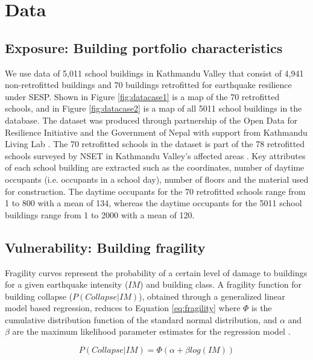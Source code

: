 \documentclass[utf8]{frontiersSCNS} %
\begin{document}
\section{Data}
\label{section-data}

\subsection{Exposure: Building portfolio characteristics}

    We use data of 5,011 school buildings in Kathmandu Valley that consist of 4,941 non-retrofitted buildings and 70 buildings retrofitted for earthquake resilience under SESP. Shown in Figure \ref{fig:datacase1} is a map of the 70 retrofitted schools, and in Figure \ref{fig:datacase2} is a map of all 5011 school buildings in the database. The dataset was produced through partnership of the Open Data for Resilience Initiative and the Government of Nepal with support from Kathmandu Living Lab \citep{opendri_2012}. The 70 retrofitted schools in the dataset is part of the 78 retrofitted schools surveyed by NSET in Kathmandu Valley's affected areas \citep{marasini_2019}. Key attributes of each school building are extracted such as the coordinates, number of daytime occupants (i.e. occupants in a school day), number of floors and the material used for construction. The daytime occupants for the 70 retrofitted schools range from 1 to 800 with a mean of 134, whereas the daytime occupants for the 5011 school buildings range from 1 to 2000 with a mean of 120.
    
\subsection{Vulnerability: Building fragility}

    Fragility curves represent the probability of a certain level of damage to buildings for a given earthquake intensity ($IM$) and building class. A fragility function for building collapse ($P(Collapse|IM)$), obtained through a generalized linear model based regression, reduces to Equation \ref{eq:fragility} where $\Phi$ is the cumulative distribution function of the standard normal distribution, and $\alpha$ and $\beta$ are the maximum likelihood parameter estimates for the regression model \citep{Lallemant2015}.

        \begin{equation}\label{eq:fragility}
            P(Collapse|IM) = \Phi(\alpha + \beta log(IM))
        \end{equation}
\end{document}
